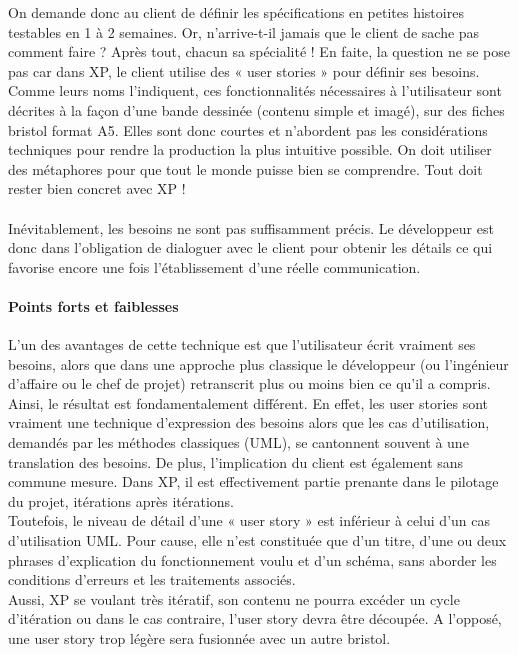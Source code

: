 \documentclass[]{article}
\let\oldparagraph\paragraph
\renewcommand{\paragraph}[1]{\oldparagraph{#1}\mbox{}}
\begin{document}
On demande donc au client de définir les spécifications en petites
histoires testables en 1 à 2 semaines. Or, n'arrive-t-il jamais que le
client de sache pas comment faire ? Après tout, chacun sa spécialité !
En faite, la question ne se pose pas car dans XP, le client utilise des
« user stories » pour définir ses besoins. Comme leurs noms l'indiquent,
ces fonctionnalités nécessaires à l'utilisateur sont décrites à la façon
d'une bande dessinée (contenu simple et imagé), sur des fiches bristol
format A5. Elles sont donc courtes et n'abordent pas les considérations
techniques pour rendre la production la plus intuitive possible. On doit
utiliser des métaphores pour que tout le monde puisse bien se
comprendre. Tout doit rester bien concret avec XP !\\
~\\
Inévitablement, les besoins ne sont pas suffisamment précis. Le
développeur est donc dans l'obligation de dialoguer avec le client pour
obtenir les détails ce qui favorise encore une fois l'établissement
d'une réelle communication.




\hypertarget{points-forts-et-faiblesses}{%
\paragraph{Points forts et
faiblesses}\label{points-forts-et-faiblesses}}

L'un des avantages de cette technique est que l'utilisateur écrit
vraiment ses besoins, alors que dans une approche plus classique le
développeur (ou l'ingénieur d'affaire ou le chef de projet) retranscrit
plus ou moins bien ce qu'il a compris.\\
Ainsi, le résultat est fondamentalement différent. En effet, les user
stories sont vraiment une technique d'expression des besoins alors que
les cas d'utilisation, demandés par les méthodes classiques (UML), se
cantonnent souvent à une translation des besoins. De plus, l'implication
du client est également sans commune mesure. Dans XP, il est
effectivement partie prenante dans le pilotage du projet, itérations
après itérations.\\
Toutefois, le niveau de détail d'une « user story » est inférieur à
celui d'un cas d'utilisation UML. Pour cause, elle n'est constituée que
d'un titre, d'une ou deux phrases d'explication du fonctionnement voulu
et d'un schéma, sans aborder les conditions d'erreurs et les traitements
associés.~\\
Aussi, XP se voulant très itératif, son contenu ne pourra excéder un
cycle d'itération ou dans le cas contraire, l'user story devra être
découpée. A l'opposé, une user story trop légère sera fusionnée avec un
autre bristol.
\end{document}
